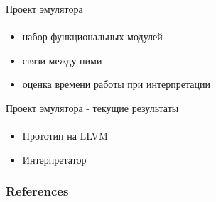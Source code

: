 \documentclass{beamer}              %
\begin{document}
\begin{frame}{Проект эмулятора}
  \framesubtitle{}
  
  \begin{itemize}
      \item набор функциональных модулей
      \item связи между ними
      \item оценка времени работы при интерпретации
  \end{itemize}
  
\end{frame}

\begin{frame}{Проект эмулятора - текущие результаты}
  \framesubtitle{}
  
  \begin{itemize}
      \item Прототип на LLVM
      \item Интерпретатор
  \end{itemize}
  
\end{frame}

\begin{frame}[allowframebreaks]
        \frametitle{References}
        
        
\end{frame}
\end{document}
